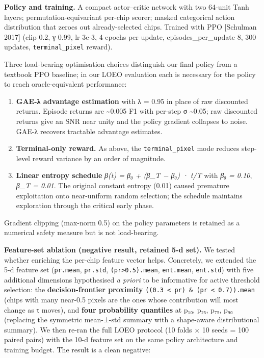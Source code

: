 \textbf{Policy and training.} A compact actor--critic network with two 64-unit
Tanh layers; permutation-equivariant per-chip scorer; masked categorical
action distribution that zeroes out already-selected chips. Trained with
PPO {[}Schulman 2017{]} (clip 0.2, γ 0.99, lr 3e-3, 4 epochs per update,
episodes\_per\_update 8, 300 updates, \texttt{terminal\_pixel} reward).

Three load-bearing optimisation choices distinguish our final policy from
a textbook PPO baseline; in our LOEO evaluation each is necessary for the
policy to reach oracle-equivalent performance:

\begin{enumerate}
\def\labelenumi{\arabic{enumi}.}
\tightlist
\item
  \textbf{GAE-λ advantage estimation} with λ = 0.95 in place of raw discounted
  returns. Episode returns are \textasciitilde0.005 F1 with per-step σ \textasciitilde0.05; raw
  discounted returns give an SNR near unity and the policy gradient
  collapses to noise. GAE-λ recovers tractable advantage estimates.
\item
  \textbf{Terminal-only reward.} As above, the \texttt{terminal\_pixel} mode reduces
  step-level reward variance by an order of magnitude.
\item
  \textbf{Linear entropy schedule} \emph{β(t) = β₀ + (β\_T − β₀) · t/T} with
  \emph{β₀ = 0.10}, \emph{β\_T = 0.01}. The original constant entropy (0.01) caused
  premature exploitation onto near-uniform random selection; the schedule
  maintains exploration through the critical early phase.
\end{enumerate}

Gradient clipping (max-norm 0.5) on the policy parameters is retained as a
numerical safety measure but is not load-bearing.

\textbf{Feature-set ablation (negative result, retained 5-d set).} We tested
whether enriching the per-chip feature vector helps. Concretely, we
extended the 5-d feature set (\texttt{pr.mean}, \texttt{pr.std}, \texttt{(pr\textgreater{}0.5).mean},
\texttt{ent.mean}, \texttt{ent.std}) with five additional dimensions hypothesised \emph{a
priori} to be informative for active threshold selection: the
\textbf{decision-frontier proximity} \texttt{((0.3\ \textless{}\ pr)\ \&\ (pr\ \textless{}\ 0.7)).mean} (chips
with many near-0.5 pixels are the ones whose contribution will most
change as τ moves), and \textbf{four probability quantiles} at p₁₀, p₂₅, p₇₅,
p₉₀ (replacing the symmetric mean-±-std summary with a shape-aware
distributional summary). We then re-ran the full LOEO protocol (10
folds × 10 seeds = 100 paired pairs) with the 10-d feature set on the
same policy architecture and training budget. The result is a clean
negative:

